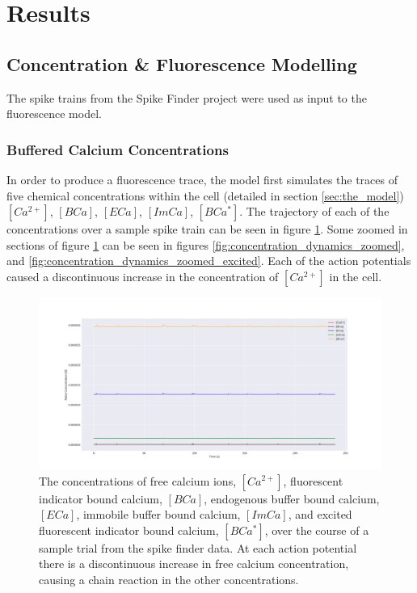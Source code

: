 \documentclass[a4paper,12pt]{article}
\theoremstyle{definition}
\begin{document}
\section{Results} %

\subsection{Concentration \& Fluorescence Modelling}
The spike trains from the Spike Finder project were used as input to the fluorescence model.

\subsubsection{Buffered Calcium Concentrations}

In order to produce a fluorescence trace, the model first simulates the traces of five chemical concentrations within the cell (detailed in section \ref{sec:the_model}) $[Ca^{2+}]$, $[BCa]$, $[ECa]$, $[ImCa]$, $[BCa^*]$. The trajectory of each of the concentrations over a sample spike train can be seen in figure \ref{fig:concentration_dynamics}. Some zoomed in sections of figure \ref{fig:concentration_dynamics} can be seen in figures \ref{fig:concentration_dynamics_zoomed}, and \ref{fig:concentration_dynamics_zoomed_excited}. Each of the action potentials caused a discontinuous increase in the concentration of $[Ca^{2+}]$ in the cell.

\begin{figure}[ht]
  \centering
  \includegraphics[width=\textwidth]{figures/concentration_dynamics_18.png}
  \caption{The concentrations of free calcium ions, $[Ca^{2+}]$, fluorescent indicator bound calcium, $[BCa]$, endogenous buffer bound calcium, $[ECa]$, immobile buffer bound calcium, $[ImCa]$, and excited fluorescent indicator bound calcium, $[BCa^*]$, over the course of a sample trial from the spike finder data. At each action potential there is a discontinuous increase in free calcium concentration, causing a chain reaction in the other concentrations.}
  \label{fig:concentration_dynamics}
\end{figure}
\end{document}
